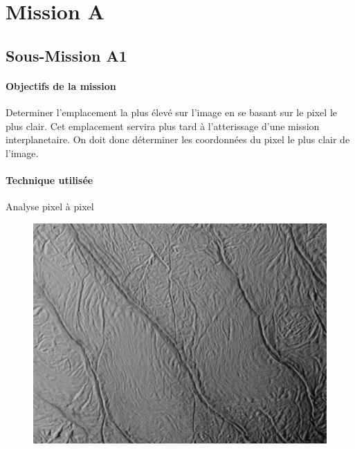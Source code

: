 \section{Mission A}
\subsection{Sous-Mission A1}

	\begin{vwcol}[widths={0.65,0.2}, rule=0pt]
		\begin{minipage}{0.7\textwidth}
			\paragraph{Objectifs de la mission}

			Determiner l'emplacement la plus élevé sur l'image en se basant sur le pixel le plus clair. Cet emplacement servira plus tard à l'atterissage d'une mission interplanetaire. On doit donc déterminer les coordonnées du pixel le plus clair de l'image.
		\end{minipage}

		\begin{minipage}{0.3\textwidth}
			\begin{flushright}
				\paragraph{Technique utilisée}
			
				Analyse pixel à pixel
			\end{flushright}
		\end{minipage}
	\end{vwcol} 

	\begin{figure}[h]
		\centering
		\includegraphics[scale=0.6]{images/Encelade_surface.png}
	\end{figure}
	\vspace{-0.3cm}


